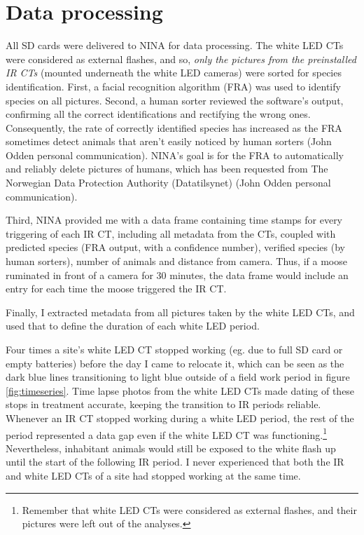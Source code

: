 \section{Data processing} 

All SD cards were delivered to NINA for data processing.
The white LED CTs were considered as external flashes, and so, \textit{only the pictures from the preinstalled IR CTs} (mounted underneath the white LED cameras) %
were sorted for species identification.
First, a facial recognition algorithm (FRA) was used to identify species on all pictures. %
Second, a human sorter reviewed the software's output, confirming all the correct identifications and rectifying the wrong ones. 
Consequently, the rate of correctly identified species has increased as the FRA sometimes detect animals that aren't easily noticed by human sorters (John Odden personal communication). 
NINA's goal is for the FRA to automatically and reliably delete pictures of humans, which has been requested from The Norwegian Data Protection Authority (Datatilsynet) (John Odden personal communication).

Third, NINA provided me with a data frame containing time stamps for every triggering of each IR CT, including all metadata from the CTs, coupled with predicted species (FRA output, with a confidence number), verified species (by human sorters), number of animals and distance from camera.
Thus, if a moose ruminated in front of a camera for 30 minutes, the data frame would include an entry for each time the moose triggered the IR CT. 

Finally, I extracted metadata from all pictures taken by the white LED CTs, %
and used that to define the duration of each white LED period.

Four times a site's white LED CT stopped working (eg. due to full SD card or empty batteries) before the day I came to relocate it, which can be seen as the dark blue lines transitioning to light blue outside of a field work period in figure \ref{fig:timeseries}.
Time lapse photos from the white LED CTs made dating of these stops in treatment accurate, keeping the transition to IR periods reliable. 
Whenever an IR CT stopped working during a white LED period, the rest of the period represented a data gap even if the white LED CT was functioning.\footnote{Remember that white LED CTs were considered as external flashes, and their pictures were left out of the analyses.} 
Nevertheless, inhabitant animals would still be exposed to the white flash up until the start of the following IR period.
I never experienced that both the IR and white LED CTs of a site had stopped working at the same time. 


